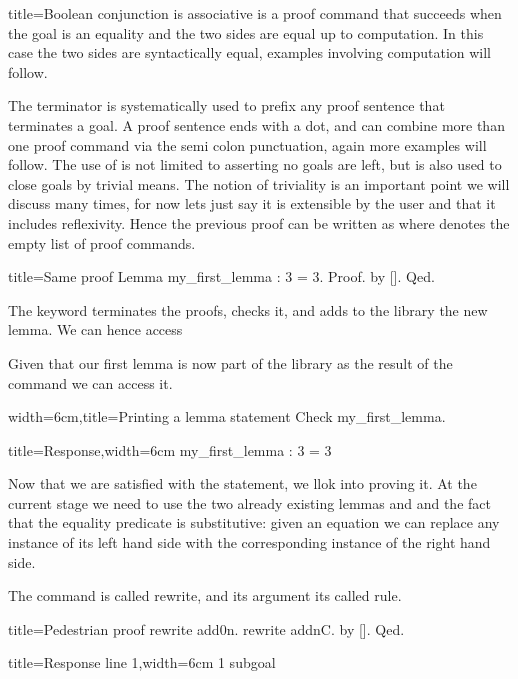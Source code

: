 \begin{coq}{title=Boolean conjunction is associative}
 is a proof command that succeeds when the goal is an equality
and the two sides are equal up to computation.  In this case the two sides
are syntactically equal, examples involving computation will follow.

The  terminator is systematically used to prefix any proof sentence
that terminates a goal.  A proof sentence ends with a dot, and can
combine more than one proof command via the semi colon punctuation,
again more examples will follow.
The use of  is not limited to asserting no goals are left,
but is also used to close goals by trivial means.  The notion of triviality
is an important point we will discuss many times, for now lets just
say it is extensible by the user and that it includes reflexivity.
Hence the previous proof can be written as  where \C{[]}
denotes the empty list of proof commands.

\begin{coq}{title=Same proof}
Lemma my_first_lemma : 3 = 3.
Proof. by []. Qed.
\end{coq}

The  keyword terminates the proofs, checks it, and adds to
the library the new lemma.  We can hence access

Given that our first lemma is now part of the library as the result
of the  command we can access it.

\begin{coq}{width=6cm,title=Printing a lemma statement}
Check my_first_lemma.
\end{coq}
\begin{coqout}{title=Response,width=6cm}
my_first_lemma : 3 = 3
\end{coqout}

Now that we are satisfied with the statement, we llok into proving it.
At the current stage we need to use the two already existing
lemmas  and  and the fact that the equality predicate
is substitutive: given an equation we can replace any instance of
its left hand side with the corresponding instance of the right hand side.

The command is called rewrite, and its argument its called rule.

\begin{coq}{title=Pedestrian proof}
rewrite add0n.
rewrite addnC.
by [].
Qed.
\end{coq}

\begin{coqout}{title=Response line 1,width=6cm}
1 subgoal


\end{coqout}
\end{coq}
